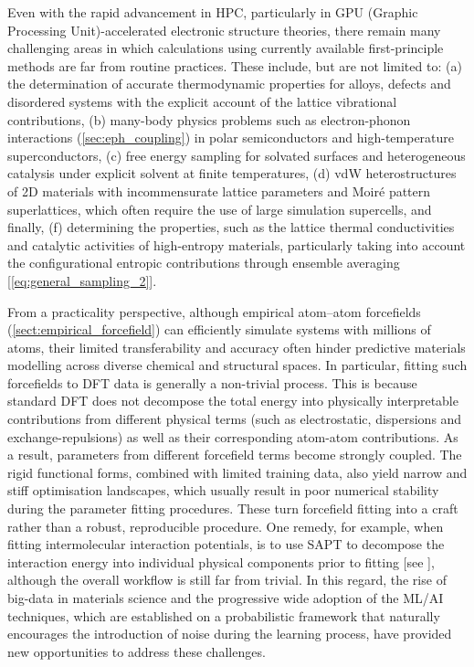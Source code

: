 Even with the rapid advancement in HPC, particularly in GPU (Graphic Processing Unit)-accelerated electronic structure theories, there remain many challenging areas in which calculations using currently available first-principle methods are far from routine practices. These include, but are not limited to: (a) the determination of accurate thermodynamic properties for alloys, defects and disordered systems with the explicit account of the lattice vibrational contributions,\cite{van2002effect} (b) many-body physics problems such as electron-phonon interactions (\cref{sec:eph_coupling})\cite{giustino2017electron} in polar semiconductors and high-temperature superconductors, (c) free energy sampling for solvated surfaces and heterogeneous catalysis under explicit solvent at finite temperatures,\cite{gono2019effect,sakong2015density,gross2022ab} (d) vdW heterostructures of 2D materials with incommensurate lattice parameters  and Moir{\'e} pattern superlattices, which often require the use of large simulation supercells,\cite{tang2020moire} and finally, (f)  determining the properties, such as the lattice thermal conductivities\cite{allen1993thermal} and catalytic activities\cite{sun2021high} of high-entropy materials, particularly taking into account the configurational entropic contributions through ensemble averaging [\cref{eq:general_sampling_2}]. 

From a practicality perspective, although empirical atom–atom forcefields (\cref{sect:empirical_forcefield}) can efficiently simulate systems with millions of atoms, their limited transferability and accuracy often hinder predictive materials modelling across diverse chemical and structural spaces. In particular, fitting such forcefields to DFT data is generally a non-trivial process. This is because standard DFT does not decompose the total energy into physically interpretable contributions from different physical terms (such as electrostatic, dispersions and exchange-repulsions) as well as their corresponding atom-atom contributions. As a result, parameters from different forcefield terms become strongly coupled. The rigid functional forms, combined with limited training data, also yield narrow and stiff optimisation landscapes, which usually result in poor numerical stability during the parameter fitting procedures. These turn forcefield fitting into a craft rather than a robust, reproducible procedure. One remedy, for example, when fitting intermolecular interaction potentials, is to use SAPT to decompose the interaction energy into individual physical components prior to fitting [see \citet{misquitta2005intermolecular,misquitta2016ab}], although the overall workflow is still far from trivial. In this regard, the rise of big-data in materials science and the progressive wide adoption of the ML/AI techniques, which are established on a probabilistic framework that naturally encourages the introduction of noise during the learning process,  have provided new opportunities to address these challenges.


